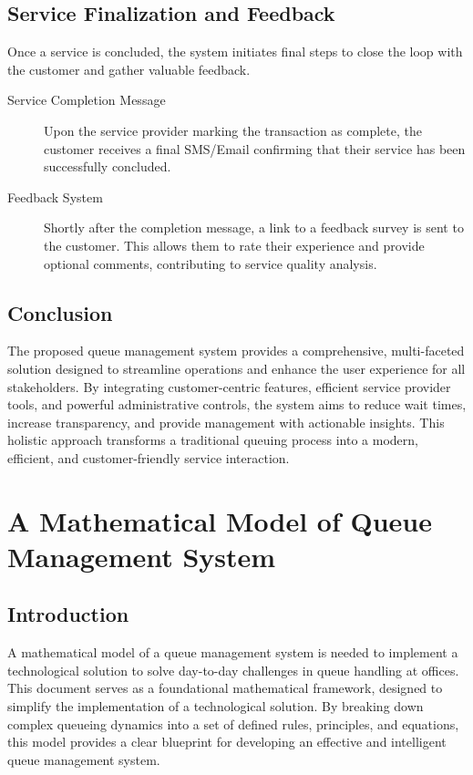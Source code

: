 \documentclass[12pt,a4paper]{report}
\begin{document}
\section{Service Finalization and Feedback}

Once a service is concluded, the system initiates final steps to close the loop with the customer and gather valuable feedback.

\begin{description}
    \item[Service Completion Message] Upon the service provider marking the transaction as complete, the customer receives a final SMS/Email confirming that their service has been successfully concluded.
    \item[Feedback System] Shortly after the completion message, a link to a feedback survey is sent to the customer. This allows them to rate their experience and provide optional comments, contributing to service quality analysis.
\end{description}

\section{Conclusion}

The proposed queue management system provides a comprehensive, multi-faceted solution designed to streamline operations and enhance the user experience for all stakeholders. By integrating customer-centric features, efficient service provider tools, and powerful administrative controls, the system aims to reduce wait times, increase transparency, and provide management with actionable insights. This holistic approach transforms a traditional queuing process into a modern, efficient, and customer-friendly service interaction.

\newpage
\chapter{A Mathematical Model of Queue Management System}

\section{Introduction}

A mathematical model of a queue management system is needed to implement a technological solution to solve day-to-day challenges in queue handling at offices. This document serves as a foundational mathematical framework, designed to simplify the implementation of a technological solution. By breaking down complex queueing dynamics into a set of defined rules, principles, and equations, this model provides a clear blueprint for developing an effective and intelligent queue management system.
\end{document}
